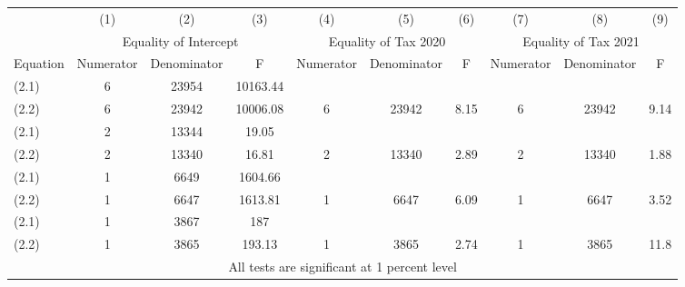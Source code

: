\begin{tabular}{lccccccccc} 
	\hline
	& (1) & (2) & (3) & (4) & (5) & (6)  & (7) & (8) & (9) \\
	&\multicolumn{3}{c}{Equality of Intercept} &\multicolumn{3}{c}{Equality of Tax 2020} &\multicolumn{3}{c}{Equality of Tax 2021}\\
	Equation&Numerator&Denominator&F&Numerator&Denominator&F&Numerator&Denominator&F\\
	(2.1)&6&23954&10163.44\\
	(2.2)&6&23942&10006.08&6&23942&8.15&6&23942&9.14\\
	(2.1)&2&13344&19.05\\
	(2.2)&2&13340&16.81&2&13340&2.89&2&13340&1.88\\
	(2.1)&1&6649&1604.66\\
	(2.2)&1&6647&1613.81&1&6647&6.09&1&6647&3.52\\
	(2.1)&1&3867&187\\
	(2.2)&1&3865&193.13&1&3865&2.74&1&3865&11.8\\
	\hline
	\multicolumn{10}{c}{ All tests are significant at 1 percent level} \\

\end{tabular}

